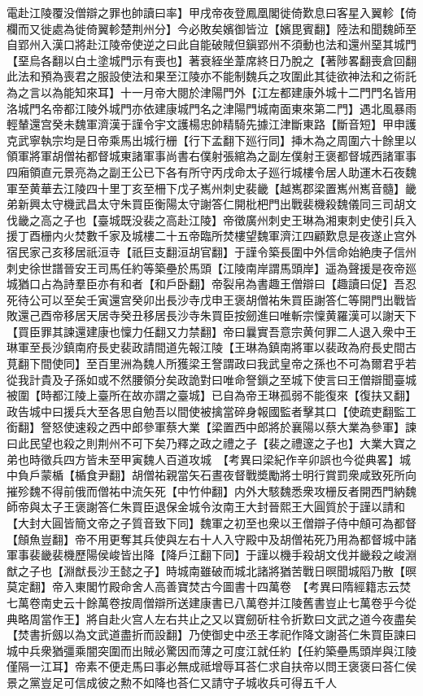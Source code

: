 電赴江陵覆没僧辯之罪也帥讀曰率】甲戌帝夜登鳳凰閣徙倚歎息曰客星入翼軫【倚欄而又徙處為徙倚翼軫楚荆州分】今必敗矣嬪御皆泣【嬪毘賓翻】陸法和聞魏師至自郢州入漢口將赴江陵帝使逆之曰此自能破賊但鎭郢州不須動也法和還州堊其城門【堊烏各翻以白土塗城門示有喪也】著衰絰坐葦席終日乃脫之【著陟畧翻喪倉回翻此法和預為喪君之服設使法和果至江陵亦不能制魏兵之攻圍此其徒欲神法和之術託為之言以為能知來耳】十一月帝大閱於津陽門外【江左都建康外城十二門門名皆用洛城門名帝都江陵外城門亦依建康城門名之津陽門城南面東來第二門】遇北風暴雨輕輦還宫癸未魏軍濟漢于謹令宇文護楊忠帥精騎先據江津斷東路【斷音短】甲申護克武寧執宗均是日帝乘馬出城行栅【行下孟翻下廵行同】挿木為之周圍六十餘里以領軍將軍胡僧祐都督城東諸軍事尚書右僕射張綰為之副左僕射王褒都督城西諸軍事四廂領直元景亮為之副王公已下各有所守丙戌命太子廵行城樓令居人助運木石夜魏軍至黄華去江陵四十里丁亥至柵下戊子嶲州刺史裴畿【越嶲郡梁置嶲州嶲音髓】畿弟新興太守機武昌太守朱買臣衡陽太守謝答仁開枇杷門出戰裴機殺魏儀同三司胡文伐畿之高之子也【臺城既没裴之高赴江陵】帝徵廣州刺史王琳為湘東刺史使引兵入援丁酉栅内火焚數千家及城樓二十五帝臨所焚樓望魏軍濟江四顧歎息是夜遂止宫外宿民家己亥移居祇洹寺【祇巨支翻洹胡官翻】于謹令築長圍中外信命始絶庚子信州刺史徐世譜晉安王司馬任約等築壘於馬頭【江陵南岸謂馬頭岸】遥為聲援是夜帝廵城猶口占為詩羣臣亦有和者【和戶卧翻】帝裂帛為書趣王僧辯曰【趣讀曰促】吾忍死待公可以至矣壬寅還宫癸卯出長沙寺戊申王褒胡僧祐朱買臣謝答仁等開門出戰皆敗還己酉帝移居天居寺癸丑移居長沙寺朱買臣按劒進曰唯斬宗懍黄羅漢可以謝天下【買臣罪其諫還建康也懍力任翻又力禁翻】帝曰曩實吾意宗黄何罪二人退入衆中王琳軍至長沙鎮南府長史裴政請間道先報江陵【王琳為鎮南將軍以裴政為府長史間古莧翻下間使同】至百里洲為魏人所獲梁王詧謂政曰我武皇帝之孫也不可為爾君乎若從我計貴及子孫如或不然腰領分矣政詭對曰唯命詧鎻之至城下使言曰王僧辯聞臺城被圍【時都江陵上臺所在故亦謂之臺城】已自為帝王琳孤弱不能復來【復扶又翻】政告城中曰援兵大至各思自勉吾以間使被擒當碎身報國監者擊其口【使疏吏翻監工銜翻】詧怒使速殺之西中郎參軍蔡大業【梁置西中郎將於襄陽以蔡大業為參軍】諫曰此民望也殺之則荆州不可下矣乃釋之政之禮之子【裴之禮邃之子也】大業大寶之弟也時徵兵四方皆未至甲寅魏人百道攻城　【考異曰梁紀作辛卯誤也今從典畧】城中負戶蒙楯【楯食尹翻】胡僧祐親當矢石晝夜督戰奬勵將士明行賞罰衆咸致死所向摧殄魏不得前俄而僧祐中流矢死【中竹仲翻】内外大駭魏悉衆攻栅反者開西門納魏師帝與太子王褒謝答仁朱買臣退保金城令汝南王大封晉熙王大圓質於于謹以請和【大封大圓皆簡文帝之子質音致下同】魏軍之初至也衆以王僧辯子侍中頠可為都督【頠魚豈翻】帝不用更奪其兵使與左右十人入守殿中及胡僧祐死乃用為都督城中諸軍事裴畿裴機歷陽侯峻皆出降【降戶江翻下同】于謹以機手殺胡文伐并畿殺之峻淵猷之子也【淵猷長沙王懿之子】時城南雖破而城北諸將猶苦戰日暝聞城䧟乃散【暝莫定翻】帝入東閣竹殿命舍人高善寶焚古今圖書十四萬卷　【考異曰隋經籍志云焚七萬卷南史云十餘萬卷按周僧辯所送建康書已八萬卷并江陵舊書豈止七萬卷乎今從典略周當作王】將自赴火宫人左右共止之又以寶劒斫柱令折歎曰文武之道今夜盡矣【焚書折劔以為文武道盡折而設翻】乃使御史中丞王孝祀作降文謝荅仁朱買臣諫曰城中兵衆猶彊乘闇突圍而出賊必驚因而薄之可度江就任約【任約築壘馬頭岸與江陵僅隔一江耳】帝素不便走馬曰事必無成祗增辱耳荅仁求自扶帝以問王褒褒曰荅仁侯景之黨豈足可信成彼之勲不如降也荅仁又請守子城收兵可得五千人
